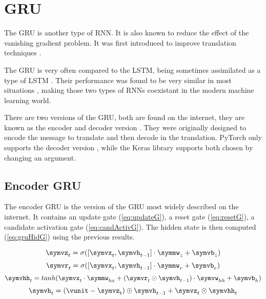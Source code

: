 \section{\acl{GRU}}\label{sec:gru}
The \acf{GRU} is another type of \ac{RNN}. It is also known to reduce the effect of the vanishing gradient problem. It was first introduced to improve translation techniques \cite{gru}.

The \ac{GRU} is very often compared to the \ac{LSTM}, being sometimes assimilated as a type of \ac{LSTM} \cite{nbLSTM}. Their performance was found to be very similar in most situations \cite{gruVSlstm}, making those two types of \acp{RNN} coexistant in the modern machine learning world.

There are two versions of the \ac{GRU}, both are found on the internet, they are known as the encoder and decoder version \cite{gru}. They were originally designed to encode the message to translate and then decode in the translation. PyTorch only supports the decoder version \cite{gruPyTorch}, while the Keras library supports both \cite{gruKeras} chosen by changing an argument.

\subsection{Encoder \ac{GRU}}

The encoder \ac{GRU} is the version of the \ac{GRU} most widely described on the internet. It contains an update gate (\cref{eq:updateG}), a reset gate (\cref{eq:resetG}), a candidate activation gate (\cref{eq:candActivG}). The hidden state is then computed (\cref{eq:gruHidG}) using the previous results.

\begin{equation}\label{eq:updateG}
  \symvz_t=\sigma ([\symvx_t,\symvh_{t-1}] \cdot \symmw_z + \symvb_z)
\end{equation}
\begin{equation}\label{eq:resetG}
  \symvr_t=\sigma ([\symvx_t,\symvh_{t-1}] \cdot \symmw_r + \symvb_r)
\end{equation}
\begin{equation}\label{eq:candActivG}
  \symvhh_t=tanh(\symvx_t\cdot \symmw_{hx}+(\symvr_t\odot\symvh_{t-1}) \cdot \symvw_{hh} + \symvb_h)
\end{equation}
\begin{equation}\label{eq:gruHidG}
  \symvh_t=(\vunit-\symvz_t)\odot \symvh_{t-1} + \symvz_t\odot \symvhh_t
\end{equation}

